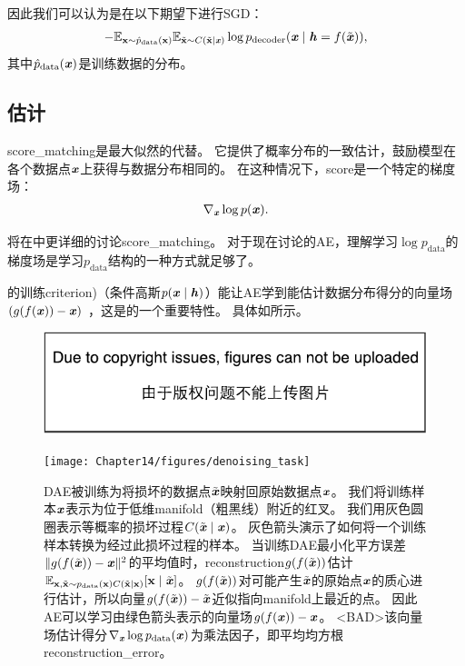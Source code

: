 因此我们可以认为是在以下期望下进行\gls{SGD}：
\begin{align}
   - \mathbb{E}_{\mathbf{x} \sim \hat{p}_{\text{data}}(\mathbf{x})} \mathbb{E}_{\tilde{\mathbf{x}} \sim C(\tilde{\mathbf{x}}\mid\boldsymbol{\mathit{x}})} \log p_{\text{decoder}}(\boldsymbol{\mathit{x}} \mid \boldsymbol{\mathit{h}} = f(\tilde{\boldsymbol{\mathit{x}}})),
\end{align}
其中$\hat{p}_{\text{data}}(\boldsymbol{\mathit{x}})$是训练数据的分布。


\subsection{估计}
\label{sec:estimating_the_score}
\gls{score_matching}\citep{Hyvarinen-2005}是最大似然的代替。
它提供了概率分布的一致估计，鼓励模型在各个数据点$\boldsymbol{\mathit{x}}$上获得与数据分布相同的。
在这种情况下，\gls{score}是一个特定的梯度场：
\begin{align}
 \nabla_{\boldsymbol{\mathit{x}}} \log p(\boldsymbol{\mathit{x}}) .
\end{align}

将在中更详细的讨论\gls{score_matching}。
对于现在讨论的\gls{AE}，理解学习$\log p_{\text{data}}$的梯度场是学习$p_{\text{data}}$结构的一种方式就足够了。


的训练\gls{criterion})（条件高斯$p(\boldsymbol{\mathit{x}} \mid \boldsymbol{\mathit{h}})$）能让\gls{AE}学到能估计数据分布得分的向量场$(g(f(\boldsymbol{\mathit{x}}))-\boldsymbol{\mathit{x}})$ ，这是的一个重要特性。
具体如所示。

\begin{figure}[!htb]
\ifOpenSource
\centerline{\includegraphics{figure.pdf}}
\else
\centerline{\texttt{[image: Chapter14/figures/denoising\_task]}}
\fi
\caption{\gls{DAE}被训练为将损坏的数据点$\tilde {\boldsymbol{\mathit{x}}}$映射回原始数据点$\boldsymbol{\mathit{x}}$。
我们将训练样本$\boldsymbol{\mathit{x}}$表示为位于低维\gls{manifold}（粗黑线）附近的红叉。
我们用灰色圆圈表示等概率的损坏过程$C(\tilde {\boldsymbol{\mathit{x}}} \mid \boldsymbol{\mathit{x}})$。
灰色箭头演示了如何将一个训练样本转换为经过此损坏过程的样本。
当训练\gls{DAE}最小化平方误差$\| g(f(\tilde {\boldsymbol{\mathit{x}}})) - \boldsymbol{\mathit{x}} \|^2$的平均值时，\gls{reconstruction}$g(f(\tilde {\boldsymbol{\mathit{x}}}))$估计$\mathbb{E}_{\mathbf{x}, \tilde{\mathbf{x}} \sim p_{\text{data}}(\mathbf{x}) C(\tilde{\mathbf{x}} \mid \mathbf{x})}[\mathbf{x} \mid \tilde{\boldsymbol{\mathit{x}}}]$。
$g(f(\tilde {\boldsymbol{\mathit{x}}}))$对可能产生$\tilde {\boldsymbol{\mathit{x}}}$的原始点$\boldsymbol{\mathit{x}}$的质心进行估计，所以向量$ g(f(\tilde {\boldsymbol{\mathit{x}}})) - \tilde {\boldsymbol{\mathit{x}}} $近似指向\gls{manifold}上最近的点。
因此\gls{AE}可以学习由绿色箭头表示的向量场$ g(f( \boldsymbol{\mathit{x}})) -  \boldsymbol{\mathit{x}} $。
<BAD>该向量场估计得分$\nabla_{\boldsymbol{\mathit{x}}} \log p_{\text{data}}(\boldsymbol{\mathit{x}})$为乘法因子，即平均均方根\gls{reconstruction_error}。
}
\label{fig:chap14_denoising_task}
\end{figure}

